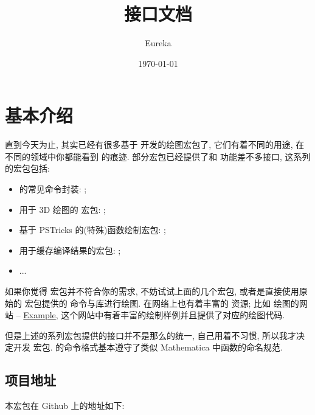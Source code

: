 \documentclass[
  hyper, lang=cn, 
  class=l3dox, 
]{../../zlatex/code/ztex}
\title{\texorpdfstring{\ztikz{} 接口文档}{zTool 接口文档}}
\author{Eureka}
\date{\today}
\begin{document}
  \maketitle
\restoregeometry
  \ztexslideTF{
    \thispagestyle{empty}
    \tableofcontents
  }{
    \thispagestyle{empty}
    \vspace*{-3em}
    \tableofcontents
    \clearpage
  }
\restoregeometry
\fancyheadoffset{0pt}

\section{基本介绍}
直到今天为止, 其实已经有很多基于  开发的绘图宏包了, 它们有着不同的用途, 在不同的领域中你都能看到 \TikZ{} 的痕迹. 
部分宏包已经提供了和  功能差不多接口, 这系列的宏包包括:
\begin{itemize}
  \item  \TikZ{} 的常见命令封装: \href{https://ctan.org/tex-archive/graphics/pgf/contrib/tzplot}{};
  \item 用于 3D 绘图的 \TikZ{} 宏包: \href{https://ctan.org/pkg/tikz-3dplot}{};
  \item 基于 PSTricks 的(特殊)函数绘制宏包: \href{https://ctan.org/pkg/pst-func}{};
  \item 用于缓存编译结果的宏包: \href{https://github.com/leo-colisson/robust-externalize}{};
  \item ...
\end{itemize}


如果你觉得  宏包并不符合你的需求, 不妨试试上面的几个宏包, 或者是直接使用原始的  宏包提供的
命令与库进行绘图. 在网络上也有着丰富的 \TikZ{} 资源; 比如 \TikZ{} 绘图的网站 -- 
\href{https://texample.net/tikz/examples/}{\textcolor{black}{\TikZ} Example}, 这个网站中有着丰富的绘制样例并且提供了对应的绘图代码.


但是上述的系列宏包提供的接口并不是那么的统一, 自己用着不习惯, 所以我才决定开发  宏包. 
\zTikZ{} 的命令格式基本遵守了类似 Mathematica 中函数的命名规范.


\subsection{项目地址}
本宏包在 Github 上的地址如下:
\end{document}
